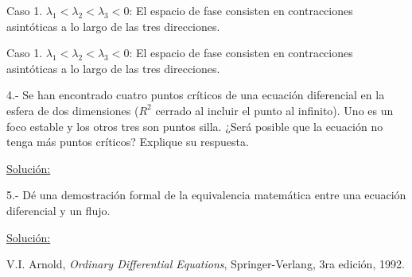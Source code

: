 \documentclass[a4paper,10pt]{article}
\begin{document}
Caso 1. $\lambda_1 < \lambda_2 < \lambda_3 < 0$: El espacio de fase consisten en contracciones asintóticas
a lo largo de las tres direcciones.


Caso 1. $\lambda_1 < \lambda_2 < \lambda_3 < 0$: El espacio de fase consisten en contracciones asintóticas
a lo largo de las tres direcciones.


4.- Se han encontrado cuatro puntos críticos de una ecuación diferencial en la esfera
de dos dimensiones ($R^2$ cerrado al incluir el punto al infinito). Uno es un foco
estable y los otros tres son puntos silla. ¿Será posible que la ecuación no tenga
más puntos críticos? Explique su respuesta.


\vspace{.3cm}

\underline{Solución:}

\vspace{.3cm}

5.- Dé una demostración formal de la equivalencia matemática entre una ecuación
diferencial y un flujo.

\vspace{.3cm}

\underline{Solución:}

\vspace{.3cm}


\begin{thebibliography}{10}
 V.I. Arnold, \emph{Ordinary Differential Equations}, Springer-Verlang,
 3ra edición, 1992.
\end{thebibliography}
\end{document}
